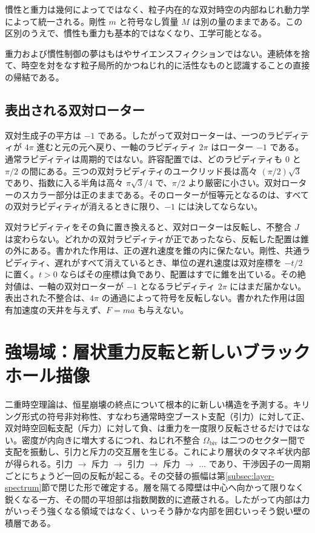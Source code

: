 \documentclass[a4paper]{article}
\begin{document}
慣性と重力は幾何によってではなく、粒子内在的な双対時空の内部ねじれ動力学によって統一される。剛性 $m$ と符号なし質量 $M$ は別の量のままである。この区別のうえで、慣性も重力も基本的ではなくなり、工学可能となる。

重力および慣性制御の夢はもはやサイエンスフィクションではない。連続体を捨て、時空を対をなす粒子局所的かつねじれ的に活性なものと認識することの直接の帰結である。

\subsection{表出される双対ローター}
\label{subsec:acceleration-limit}

双対生成子の平方は $-1$ である。したがって双対ローターは、一つのラピディティが $4\pi$ 進むと元の元へ戻り、一軸のラピディティ $2\pi$ はローター $-1$ である。通常ラピディティは周期的ではない。許容配置では、どのラピディティも $0$ と $\pi/2$ の間にある。三つの双対ラピディティのユークリッド長は高々 $(\pi/2)\sqrt{3}$ であり、指数に入る半角は高々 $\pi\sqrt{3}/4$ で、$\pi/2$ より厳密に小さい。双対ローターのスカラー部分は正のままである。そのローターが恒等元となるのは、すべての双対ラピディティが消えるときに限り、$-1$ には決してならない。

双対ラピディティをその負に置き換えると、双対ローターは反転し、不整合 $J$ は変わらない。どれかの双対ラピディティが正であったなら、反転した配置は錐の外にある。書かれた作用は、正の遅れ速度を錐の内に保たない。剛性、共通ラピディティ、遅れがすべて消えているとき、単位の遅れ速度は双対座標を $-t/2$ に置く。$t>0$ ならばその座標は負であり、配置はすでに錐を出ている。その絶対値は、一軸の双対ローターが $-1$ となるラピディティ $2\pi$ にはまだ届かない。表出された不整合は、$4\pi$ の通過によって符号を反転しない。書かれた作用は固有加速度の天井を与えず、$F=ma$ も与えない。

\section{強場域：層状重力反転と新しいブラックホール描像}
\label{sec:strongfield}

二重時空理論は、恒星崩壊の終点について根本的に新しい構造を予測する。キリング形式の符号非対称性、すなわち通常時空ブースト支配（引力）に対して正、双対時空回転支配（斥力）に対して負、は重力を一度限り反転させるだけではない。密度が内向きに増大するにつれ、ねじれ不整合 $\Omega_\text{biv}$ は二つのセクター間で支配を振動し、引力と斥力の交互層を生じる。これにより層状のタマネギ状内部が得られる。引力 $\to$ 斥力 $\to$ 引力 $\to$ 斥力 $\to$ $\ldots$ であり、干渉因子の一周期ごとにちょうど一回の反転が起こる。その交替の振幅は第\ref{subsec:layer-spectrum}節で閉じた形で確定する。層を隔てる障壁は中心へ向かって限りなく鋭くなる一方、その間の平坦部は指数関数的に遮蔽される。したがって内部は力がいっそう強くなる領域ではなく、いっそう静かな内部を囲むいっそう鋭い壁の積層である。
\end{document}
